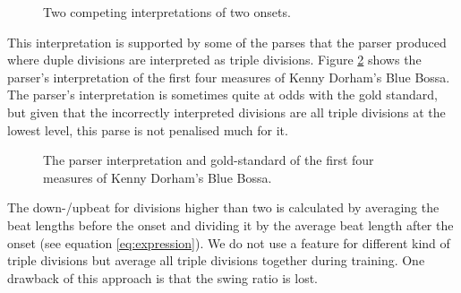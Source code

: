 \begin{figure}
\centering
{}
\caption{Two competing interpretations of two onsets.}
\label{fig:discuss1}
\end{figure}

This interpretation is supported by some of the parses that the parser produced where duple divisions are interpreted as triple divisions. Figure \ref{fig:blue_bossa} shows the parser's interpretation of the first four measures of Kenny Dorham's Blue Bossa. The parser's interpretation is sometimes quite at odds with the gold standard, but given that the incorrectly interpreted divisions are all triple divisions at the lowest level, this parse is not penalised much for it.

\begin{figure}
\centering
{}

\caption{The parser interpretation and gold-standard of the first four measures of Kenny Dorham's Blue Bossa.}
\label{fig:blue_bossa}
\end{figure}

The down-/upbeat for divisions higher than two is calculated by averaging the beat lengths before the onset and dividing it by the average beat length after the onset (see equation \ref{eq:expression}). We do not use a feature for different kind of triple divisions but average all triple divisions together during training. One drawback of this approach is that the swing ratio is lost.

